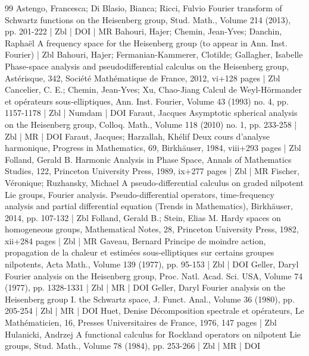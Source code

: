 \documentclass[10pt]{amsart}
\theoremstyle{definition}\newtheorem{defi}[theo]{Definition}\newtheorem{rema}[theo]{Remark}\newtheorem{exam}[theo]{Example}\newtheorem{exem}[theo]{Example}\newtheorem{nota}[theo]{Notation}
\begin{document}
\begin{thebibliography}{99}
Astengo, Francesca; Di Blasio, Bianca; Ricci, Fulvio Fourier transform of Schwartz functions on the Heisenberg group, Stud. Math., Volume 214 (2013), pp. 201-222 | Zbl | DOI | MR
Bahouri, Hajer; Chemin, Jean-Yves; Danchin, Raphaël A frequency space for the Heisenberg group (to appear in Ann. Inst. Fourier) | Zbl
Bahouri, Hajer; Fermanian-Kammerer, Clotilde; Gallagher, Isabelle Phase-space analysis and pseudodifferential calculus on the Heisenberg group, Astérisque, 342, Société Mathématique de France, 2012, vi+128 pages | Zbl
Cancelier, C. E.; Chemin, Jean-Yves; Xu, Chao-Jiang Calcul de Weyl-Hörmander et opérateurs sous-elliptiques, Ann. Inst. Fourier, Volume 43 (1993) no. 4, pp. 1157-1178 | Zbl | Numdam | DOI
Faraut, Jacques Asymptotic spherical analysis on the Heisenberg group, Colloq. Math., Volume 118 (2010) no. 1, pp. 233-258 | Zbl | MR | DOI
Faraut, Jacques; Harzallah, Khélif Deux cours d’analyse harmonique, Progress in Mathematics, 69, Birkhäuser, 1984, viii+293 pages | Zbl
Folland, Gerald B. Harmonic Analysis in Phase Space, Annals of Mathematics Studies, 122, Princeton University Press, 1989, ix+277 pages | Zbl | MR
Fischer, Véronique; Ruzhansky, Michael A pseudo-differential calculus on graded nilpotent Lie groups, Fourier analysis. Pseudo-differential operators, time-frequency analysis and partial differential equation (Trends in Mathematics), Birkhäuser, 2014, pp. 107-132 | Zbl
Folland, Gerald B.; Stein, Elias M. Hardy spaces on homogeneous groups, Mathematical Notes, 28, Princeton University Press, 1982, xii+284 pages | Zbl | MR
Gaveau, Bernard Principe de moindre action, propagation de la chaleur et estimées sous-elliptiques sur certains groupes nilpotents, Acta Math., Volume 139 (1977), pp. 95-153 | Zbl | DOI
Geller, Daryl Fourier analysis on the Heisenberg group, Proc. Natl. Acad. Sci. USA, Volume 74 (1977), pp. 1328-1331 | Zbl | MR | DOI
Geller, Daryl Fourier analysis on the Heisenberg group I. the Schwartz space, J. Funct. Anal., Volume 36 (1980), pp. 205-254 | Zbl | MR | DOI
Huet, Denise Décomposition spectrale et opérateurs, Le Mathématicien, 16, Presses Universitaires de France, 1976, 147 pages | Zbl
Hulanicki, Andrzej A functional calculus for Rockland operators on nilpotent Lie groups, Stud. Math., Volume 78 (1984), pp. 253-266 | Zbl | MR | DOI

\end{thebibliography}
\end{document}
